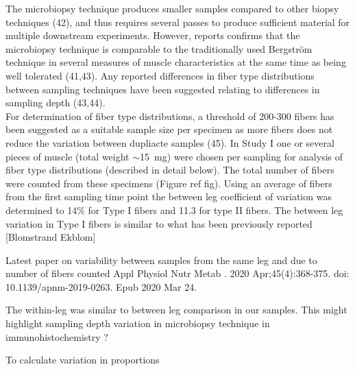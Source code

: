 \documentclass[twoside,10pt]{gihclass} %
\begin{document}
The microbiopsy technique produces smaller samples compared to other biopsy techniques
(42), and thus requires several passes to produce sufficient material for multiple downstream experiments. However, reports confirms that the microbiopsy technique is comparable to the traditionally used Bergström technique in several measures of muscle characteristics at the same time as being well tolerated
(41,43).
Any reported differences in fiber type distributions between sampling techniques have been suggested relating to differences in sampling depth
(43,44). \\
For determination of fiber type distributions, a threshold of 200-300 fibers has been suggested as a suitable sample size per specimen as more fibers does not reduce the variation between dupliacte samples
(45).
In Study I one or several pieces of muscle (total weight \(\sim\)\SI{15}{mg}) were chosen per sampling for analysis of fiber type distributions (described in detail below). The total number of fibers were counted from these specimens (Figure ref fig). Using an average of fibers from the first sampling time point the between leg coefficient of variation was determined to 14\% for Type I fibers and 11.3 for type II fibers. The between leg variation in Type I fibers is similar to what has been previously reported {[}Blomstrand Ekblom{]}

Latest paper on variability between samples from the same leg and due to number of fibers counted
Appl Physiol Nutr Metab
. 2020 Apr;45(4):368-375. doi: 10.1139/apnm-2019-0263. Epub 2020 Mar 24.

The within-leg was similar to between leg comparison in our samples. This might highlight sampling depth variation in microbiopsy technique in immunohistochemistry ?

To calculate variation in proportions
\end{document}
